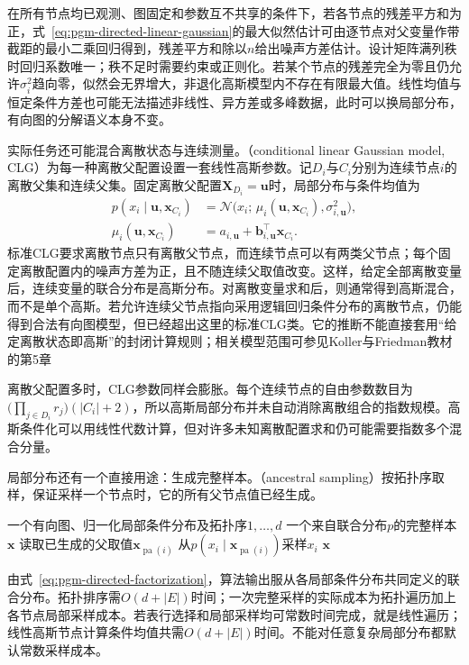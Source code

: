 在所有节点均已观测、图固定和参数互不共享的条件下，若各节点的残差平方和为正，式~\eqref{eq:pgm-directed-linear-gaussian}的最大似然估计可由逐节点对父变量作带截距的最小二乘回归得到，残差平方和除以$n$给出噪声方差估计。设计矩阵满列秩时回归系数唯一；秩不足时需要约束或正则化。若某个节点的残差完全为零且仍允许$\sigma_i^2$趋向零，似然会无界增大，非退化高斯模型内不存在有限最大值。线性均值与恒定条件方差也可能无法描述非线性、异方差或多峰数据，此时可以换局部分布，有向图的分解语义本身不变。

实际任务还可能混合离散状态与连续测量。（conditional linear Gaussian model, CLG）为每一种离散父配置设置一套线性高斯参数。记$D_i$与$C_i$分别为连续节点$i$的离散父集和连续父集。固定离散父配置$\bm X_{D_i}=\bm u$时，局部分布与条件均值为
\[
  \begin{aligned}
    p(x_i\mid\bm u,\bm{x}_{C_i})
      &=\mathcal N\bigl(
        x_i;\,\mu_i(\bm u,\bm x_{C_i}),\sigma_{i,\bm u}^2\bigr),\\
    \mu_i(\bm u,\bm x_{C_i})
      &=a_{i,\bm u}+\bm b_{i,\bm u}^{\top}\bm{x}_{C_i}.
  \end{aligned}
\]
标准CLG要求离散节点只有离散父节点，而连续节点可以有两类父节点；每个固定离散配置内的噪声方差为正，且不随连续父取值改变。这样，给定全部离散变量后，连续变量的联合分布是高斯分布。对离散变量求和后，则通常得到高斯混合，而不是单个高斯。若允许连续父节点指向采用逻辑回归条件分布的离散节点，仍能得到合法有向图模型，但已经超出这里的标准CLG类。它的推断不能直接套用“给定离散状态即高斯”的封闭计算规则；相关模型范围可参见Koller与Friedman教材的第5章

离散父配置多时，CLG参数同样会膨胀。每个连续节点的自由参数数目为$\bigl(\prod_{j\in D_i}r_j\bigr)(|C_i|+2)$，所以高斯局部分布并未自动消除离散组合的指数规模。高斯条件化可以用线性代数计算，但对许多未知离散配置求和仍可能需要指数多个混合分量。

局部分布还有一个直接用途：生成完整样本。（ancestral sampling）按拓扑序取样，保证采样一个节点时，它的所有父节点值已经生成。
\begin{algorithm}[有向图上的祖先采样]
  \label{alg:pgm-directed-ancestral-sampling}
  \begin{algorithmic}[1]
    \Require 一个有向图、归一化局部条件分布及拓扑序$1,\ldots,d$
    \Ensure 一个来自联合分布$p$的完整样本$\bm{x}$
      \State 读取已生成的父取值$\bm{x}_{\operatorname{pa}(i)}$
      \State 从$p(x_i\mid\bm{x}_{\operatorname{pa}(i)})$采样$x_i$
    \EndFor
    \State \Return $\bm{x}$
  \end{algorithmic}
\end{algorithm}
由式~\eqref{eq:pgm-directed-factorization}，算法输出服从各局部条件分布共同定义的联合分布。拓扑排序需$O(d+|E|)$时间；一次完整采样的实际成本为拓扑遍历加上各节点局部采样成本。若表行选择和局部采样均可常数时间完成，就是线性遍历；线性高斯节点计算条件均值共需$O(d+|E|)$时间。不能对任意复杂局部分布都默认常数采样成本。

